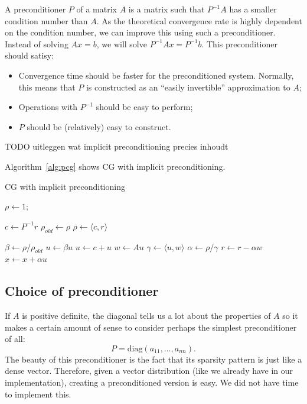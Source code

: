 \documentclass[11pt]{amsart}
\theoremstyle{definition}
\begin{document}
A preconditioner $P$ of a matrix $A$ is a matrix such that $P^{-1}A$ has a smaller condition number than $A$. As the theoretical convergence rate is highly dependent on the condition number, we can improve this using such a preconditioner. Instead of solving $Ax = b$, we will solve $P^{-1}Ax = P^{-1}b$. This preconditioner should satisy:
\begin{itemize}
  \item Convergence time should be faster for the preconditioned system. Normally, this means that $P$ is constructed as an ``easily invertible'' approximation to $A$;
  \item Operations with $P^{-1}$ should be easy to perform;
  \item $P$ should be (relatively) easy to construct.
\end{itemize}

TODO uitleggen wat implicit preconditioning precies inhoudt

Algorithm~\ref{alg:pcg} shows CG with implicit preconditioning. \cite[Lect.~10]{sleij}
\begin{algorithm}
  \caption{CG with implicit preconditioning \cite[Lect.~10]{sleij}}
  \label{alg:pcg}
    $\rho \gets 1$;
		 {
       $c \gets P^{-1} r$\;
       $\rho_{old} \gets \rho$\;
       $\rho \gets \langle c, r \rangle$\;
      
			  {
         $\beta \gets \rho/\rho_{old}$\;
         $u \gets \beta u$\;
			}
       $u \gets c + u$\;
       $w \gets Au$\;
       $\gamma \gets \langle u, w \rangle$\;
       $\alpha \gets \rho/\gamma$\;
       $r \gets r - \alpha w$\;
       $x \gets x + \alpha u$\;
		 }
\end{algorithm}

\subsection{Choice of preconditioner}
If $A$ is positive definite, the diagonal tells us a lot about the properties of $A$ so it makes a certain amount of sense to consider perhaps the simplest preconditioner of all:
\[
  P = \text{diag}(a_{11}, \ldots, a_{nn}).
\]
The beauty of this preconditioner is the fact that its sparsity pattern is just like a dense vector. Therefore, given a vector distribution (like we already have in our implementation), creating a preconditioned version is easy. We did not have time to implement this.
\end{document}
